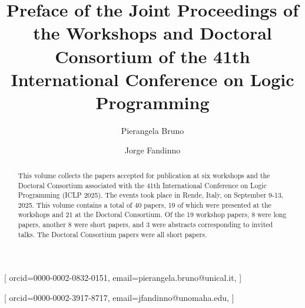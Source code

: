 \documentclass[
]{ceurart}
\begin{document}


\title{Preface of the Joint Proceedings of the Workshops and Doctoral Consortium of the 41th International Conference on Logic Programming}


\author[1]{Pierangela Bruno}[%
orcid=0000-0002-0832-0151,
email=pierangela.bruno@unical.it,
]
\address[2]{University of Calabria, Italy}


\author[2]{Jorge Fandinno}[%
orcid=0000-0002-3917-8717,
email=jfandinno@unomaha.edu,
]
\address[2]{University of Nebraska Omaha, USA}

\def\changemargin#1#2{\list{}{\rightmargin#2\leftmargin#1}\item[]}
\let\endchangemargin=\endlist 

\newcommand{\workshopp}[2]{\section{#1}\vspace{-8pt}\begin{changemargin}{19pt}{8pt} 
\rm\normalsize\it #2\end{changemargin}}
\newcommand{\workshop}[3]{\workshopp{#2}{#1 #2 (#3)}}


\begin{abstract}
This volume collects the papers accepted for publication at six workshops and the Doctoral Consortium associated with the 41th International Conference on Logic Programming (ICLP 2025).
%
The events took place in Rende, Italy, on September 9-13, 2025.
%
This volume contains a total of 40 papers, 19 of which were presented at the workshops and 21 at the Doctoral Consortium.
%
Of the 19 workshop papers, 8 were long papers, another 8 were short papers, and 3 were abstracts corresponding to invited talks.
%
The Doctoral Consortium papers were all short papers.
\end{abstract}
\end{document}
